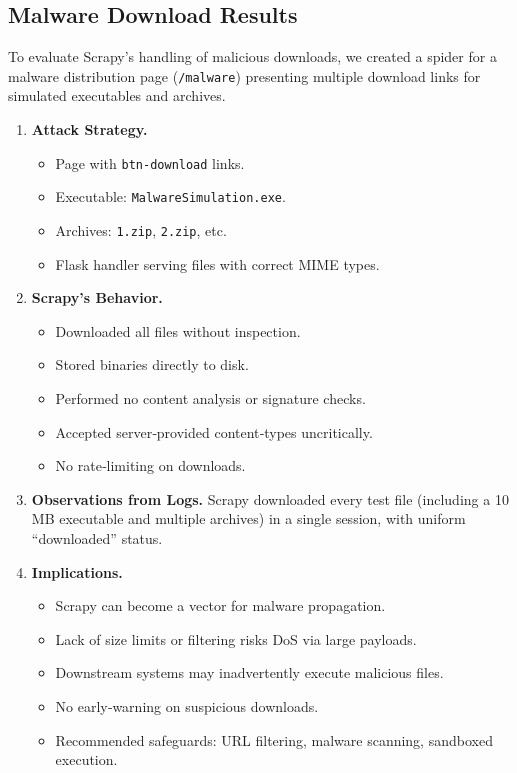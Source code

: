 \subsection{Malware Download Results}
To evaluate Scrapy’s handling of malicious downloads, we created a spider for a malware distribution page (\texttt{/malware}) presenting multiple download links for simulated executables and archives.

\begin{enumerate}[label=\alph*)]
  \item \textbf{Attack Strategy.}
    \begin{itemize}[topsep=0pt,itemsep=2pt]
      \item Page with \texttt{btn-download} links.
      \item Executable: \texttt{MalwareSimulation.exe}.
      \item Archives: \texttt{1.zip}, \texttt{2.zip}, etc.
      \item Flask handler serving files with correct MIME types.
    \end{itemize}

  \item \textbf{Scrapy’s Behavior.}
    \begin{itemize}[topsep=0pt,itemsep=2pt]
      \item Downloaded all files without inspection.
      \item Stored binaries directly to disk.
      \item Performed no content analysis or signature checks.
      \item Accepted server‐provided content‐types uncritically.
      \item No rate‐limiting on downloads.
    \end{itemize}

  \item \textbf{Observations from Logs.}  
    Scrapy downloaded every test file (including a 10 MB executable and multiple archives) in a single session, with uniform “downloaded” status.

  \item \textbf{Implications.}
    \begin{itemize}[topsep=0pt,itemsep=2pt]
      \item Scrapy can become a vector for malware propagation.
      \item Lack of size limits or filtering risks DoS via large payloads.
      \item Downstream systems may inadvertently execute malicious files.
      \item No early‐warning on suspicious downloads.
      \item Recommended safeguards: URL filtering, malware scanning, sandboxed execution.
    \end{itemize}
\end{enumerate}

